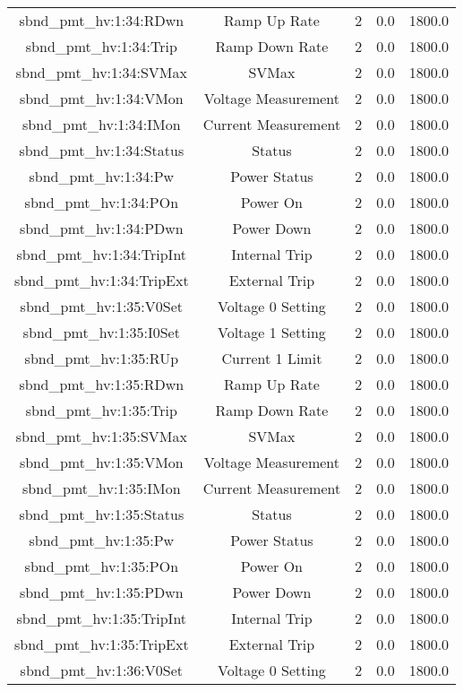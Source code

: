 \begin{center}
\begin{longtable}{c | c c c c }
sbnd\_pmt\_hv:1:34:RDwn & Ramp Up Rate & 2 & 0.0 & 1800.0\\ 
sbnd\_pmt\_hv:1:34:Trip & Ramp Down Rate & 2 & 0.0 & 1800.0\\ 
sbnd\_pmt\_hv:1:34:SVMax & SVMax & 2 & 0.0 & 1800.0\\ 
sbnd\_pmt\_hv:1:34:VMon & Voltage Measurement & 2 & 0.0 & 1800.0\\ 
sbnd\_pmt\_hv:1:34:IMon & Current Measurement & 2 & 0.0 & 1800.0\\ 
sbnd\_pmt\_hv:1:34:Status & Status & 2 & 0.0 & 1800.0\\ 
sbnd\_pmt\_hv:1:34:Pw & Power Status & 2 & 0.0 & 1800.0\\ 
sbnd\_pmt\_hv:1:34:POn & Power On & 2 & 0.0 & 1800.0\\ 
sbnd\_pmt\_hv:1:34:PDwn & Power Down & 2 & 0.0 & 1800.0\\ 
sbnd\_pmt\_hv:1:34:TripInt & Internal Trip & 2 & 0.0 & 1800.0\\ 
sbnd\_pmt\_hv:1:34:TripExt & External Trip & 2 & 0.0 & 1800.0\\ 
sbnd\_pmt\_hv:1:35:V0Set & Voltage 0 Setting & 2 & 0.0 & 1800.0\\ 
sbnd\_pmt\_hv:1:35:I0Set & Voltage 1 Setting & 2 & 0.0 & 1800.0\\ 
sbnd\_pmt\_hv:1:35:RUp & Current 1 Limit & 2 & 0.0 & 1800.0\\ 
sbnd\_pmt\_hv:1:35:RDwn & Ramp Up Rate & 2 & 0.0 & 1800.0\\ 
sbnd\_pmt\_hv:1:35:Trip & Ramp Down Rate & 2 & 0.0 & 1800.0\\ 
sbnd\_pmt\_hv:1:35:SVMax & SVMax & 2 & 0.0 & 1800.0\\ 
sbnd\_pmt\_hv:1:35:VMon & Voltage Measurement & 2 & 0.0 & 1800.0\\ 
sbnd\_pmt\_hv:1:35:IMon & Current Measurement & 2 & 0.0 & 1800.0\\ 
sbnd\_pmt\_hv:1:35:Status & Status & 2 & 0.0 & 1800.0\\ 
sbnd\_pmt\_hv:1:35:Pw & Power Status & 2 & 0.0 & 1800.0\\ 
sbnd\_pmt\_hv:1:35:POn & Power On & 2 & 0.0 & 1800.0\\ 
sbnd\_pmt\_hv:1:35:PDwn & Power Down & 2 & 0.0 & 1800.0\\ 
sbnd\_pmt\_hv:1:35:TripInt & Internal Trip & 2 & 0.0 & 1800.0\\ 
sbnd\_pmt\_hv:1:35:TripExt & External Trip & 2 & 0.0 & 1800.0\\ 
sbnd\_pmt\_hv:1:36:V0Set & Voltage 0 Setting & 2 & 0.0 & 1800.0\\ 

\end{longtable}
\end{center}
